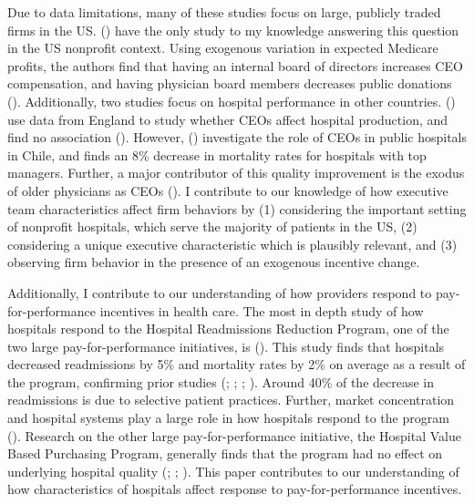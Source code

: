 \documentclass[12pt]{article}
\begin{document}
    Due to data limitations, many of these studies focus on large, publicly traded firms in the US. \citeauthor{brickley2010board} (\citeyear{brickley2010board}) have the only study to my knowledge answering this question in the US nonprofit context. Using exogenous variation in expected Medicare profits, the authors find that having an internal board of directors increases CEO compensation, and having physician board members decreases public donations (\cite{brickley2010board}). Additionally, two studies focus on hospital performance in other countries. \citeauthor{janke2019impact} (\citeyear{janke2019impact}) use data from England to study whether CEOs affect hospital production, and find no association (\cite{janke2019impact}). However, \citeauthor{otero2022managers} (\citeyear{otero2022managers}) investigate the role of CEOs in public hospitals in Chile, and finds an 8\% decrease in mortality rates for hospitals with top managers. Further, a major contributor of this quality improvement is the exodus of older physicians as CEOs (\cite{otero2022managers}). I contribute to our knowledge of how executive team characteristics affect firm behaviors by (1) considering the important setting of nonprofit hospitals, which serve the majority of patients in the US, (2) considering a unique executive characteristic which is plausibly relevant, and (3) observing firm behavior in the presence of an exogenous incentive change. 

    Additionally, I contribute to our understanding of how providers respond to pay-for-performance incentives in health care. The most in depth study of how hospitals respond to the Hospital Readmissions Reduction Program, one of the two large pay-for-performance initiatives, is \citeauthor{gupta2021impacts} (\citeyear{gupta2021impacts}). This study finds that hospitals decreased readmissions by 5\% and mortality rates by 2\% on average as a result of the program, confirming prior studies (\cite{mellor2017does}; \cite{ziedan2018essays}; \cite{ody2019decreases}; \cite{gupta2021impacts}). Around 40\% of the decrease in readmissions is due to selective patient practices. Further, market concentration and hospital systems play a large role in how hospitals respond to the program (\cite{kunz2024assessing}). Research on the other large pay-for-performance initiative, the Hospital Value Based Purchasing Program, generally finds that the program had no effect on underlying hospital quality (\cite{us2015hospital}; \cite{norton2018moneyball}; \cite{friedson2019so}). This paper contributes to our understanding of how characteristics of hospitals affect response to pay-for-performance incentives.
\end{document}
